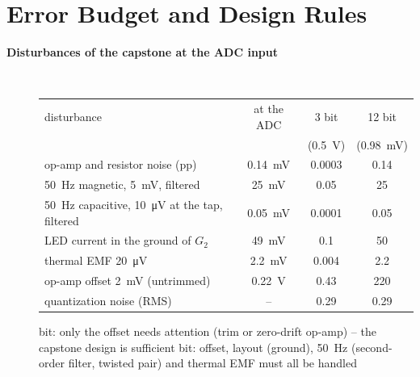 \section{Error Budget and Design Rules}

\begin{description}
\item[{\rot\bf Disturbances of the capstone at the ADC input}]~\\[-\lblskip]
\begin{center}
\begin{tabular}{lccc}
\toprule
disturbance & at the ADC & 3 bit & 12 bit \\
 & & (\SI{0.5}{\volt}) & (\SI{0.98}{\milli\volt}) \\
\midrule
op-amp and resistor noise (pp) & \SI{0.14}{\milli\volt} & 0.0003 & 0.14 \\
\SI{50}{\hertz} magnetic, \SI{5}{\milli\volt}, filtered & \SI{25}{\milli\volt} & 0.05 & 25 \\
\SI{50}{\hertz} capacitive, \SI{10}{\micro\volt} at the tap, filtered & \SI{0.05}{\milli\volt} & 0.0001 & 0.05 \\
LED current in the ground of $G_2$ & \SI{49}{\milli\volt} & 0.1 & 50 \\
thermal EMF \SI{20}{\micro\volt} & \SI{2.2}{\milli\volt} & 0.004 & 2.2 \\
op-amp offset \SI{2}{\milli\volt} (untrimmed) & \SI{0.22}{\volt} & 0.43 & 220 \\
quantization noise (RMS) & -- & 0.29 & 0.29 \\
\bottomrule
\end{tabular}
\end{center}
\bi
	 bit: only the offset needs attention (trim or zero-drift op-amp) -- the capstone design is sufficient
	 bit: offset, layout (ground), \SI{50}{\hertz} (second-order filter, twisted pair) and thermal EMF must all be handled
\ei
\os{\newpage}


\end{description}
